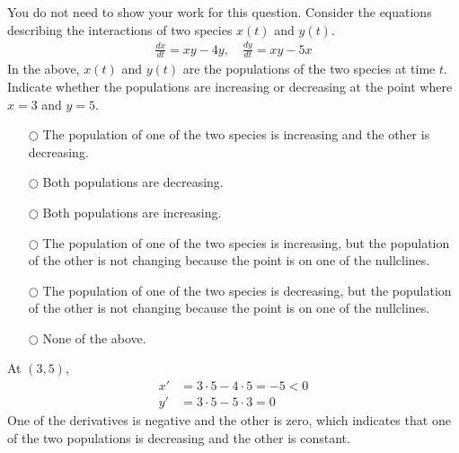 \ifnum {}
\question[1] You do not need to show your work for this question. Consider the equations describing the interactions of two species $x(t)$ and $y(t)$.
\begin{align}
    \frac{dx}{dt} = xy-4y, \quad \frac{dy}{dt} = xy-5x
\end{align}
In the above, $x(t)$ and $y(t)$ are the populations of the two species at time $t$. Indicate whether the populations are increasing or decreasing at the point where $x=3$ and $y=5$. 
\begin{itemize}
    \item[$\bigcirc$] The population of one of the two species is increasing and the other is decreasing. 
    \item[$\bigcirc$]Both populations are decreasing.
    \item[$\bigcirc$]Both populations are increasing.
    \item[$\bigcirc$]The population of one of the two species is increasing, but the population of the other is not changing because the point is on one of the nullclines. 
    \item[$\bigcirc$]The population of one of the two species is decreasing, but the population of the other is not changing because the point is on one of the nullclines. 
    \item[$\bigcirc$]None of the above.
\end{itemize}
\ifnum {} {\color{DarkBlue}
At $(3,5)$, 
\begin{align}
    x' &= 3\cdot5 - 4\cdot 5 = - 5 < 0\\
    y' &= 3\cdot5-5\cdot3 = 0 
\end{align}
One of the derivatives is negative and the other is zero, which indicates that one of the two populations is decreasing and the other is constant. 
} 
\else 
\vspace{0.5cm}
\fi    
\fi 


